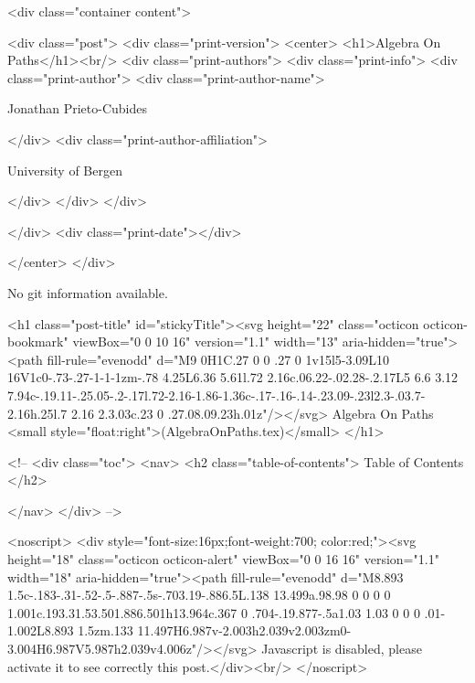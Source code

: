       <div class="container content">
        







<div class="post">
  <div class="print-version">
    <center>
      <h1>Algebra On Paths</h1><br/>
        <div class="print-authors">
          <div class="print-info">
            <div class="print-author">
              <div class="print-author-name">
                
                  Jonathan Prieto-Cubides
                
              </div>
              <div class="print-author-affiliation">
                
                  University of Bergen
                
                </div>
            </div>
          </div>
          
          
        </div>
        <div class="print-date"></div>
        
        
    </center>
  </div>

  
  No git information available.
  

  <h1 class="post-title" id="stickyTitle"><svg height="22" class="octicon octicon-bookmark" viewBox="0 0 10 16" version="1.1" width="13" aria-hidden="true"><path fill-rule="evenodd" d="M9 0H1C.27 0 0 .27 0 1v15l5-3.09L10 16V1c0-.73-.27-1-1-1zm-.78 4.25L6.36 5.61l.72 2.16c.06.22-.02.28-.2.17L5 6.6 3.12 7.94c-.19.11-.25.05-.2-.17l.72-2.16-1.86-1.36c-.17-.16-.14-.23.09-.23l2.3-.03.7-2.16h.25l.7 2.16 2.3.03c.23 0 .27.08.09.23h.01z"/></svg> Algebra On Paths <small style="float:right">(AlgebraOnPaths.tex)</small>
  </h1>

  <!-- 
  <div class="toc">
    <nav>
    <h2 class="table-of-contents"> Table of Contents </h2>
      

    </nav>
  </div>
   -->

  <noscript>
  <div style="font-size:16px;font-weight:700; color:red;"><svg height="18" class="octicon octicon-alert" viewBox="0 0 16 16" version="1.1" width="18" aria-hidden="true"><path fill-rule="evenodd" d="M8.893 1.5c-.183-.31-.52-.5-.887-.5s-.703.19-.886.5L.138 13.499a.98.98 0 0 0 0 1.001c.193.31.53.501.886.501h13.964c.367 0 .704-.19.877-.5a1.03 1.03 0 0 0 .01-1.002L8.893 1.5zm.133 11.497H6.987v-2.003h2.039v2.003zm0-3.004H6.987V5.987h2.039v4.006z"/></svg> Javascript is disabled, please activate it to see correctly this post.</div><br/>
  </noscript>

